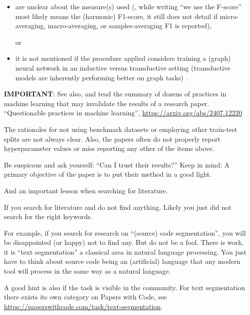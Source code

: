 \documentclass[sigconf, review, nonacm]{acmart}
\begin{document}
\begin{tcolorbox}[title=Instructions]
\begin{itemize}
\item are unclear about the measure(s) used (\eg, while writing ``we use the F-score'' most likely means the (harmonic) F1-score, it still does not detail if micro-averaging, macro-averaging, or samples-averaging F1 is reported),
%

or

\item it is not mentioned if the procedure applied considers training a (graph) neural network in an inductive versus transductive setting (transductive models are inherently performing better on graph tasks)
%
.


\end{itemize}

\textbf{IMPORTANT}: See also, and tead the summary of dozens of practices in machine learning that may invalidate the results of a research paper.
%
``Questionable practices in machine learning'', \url{https://arxiv.org/abs/2407.12220}

\end{tcolorbox}

The rationales for not using benchmark datasets or employing other train-test splits are not always clear.
Also, the papers often do not properly report hyperparameter values or miss reporting any other of the items above.

\begin{tcolorbox}[title=As a general rule when reading related work]

Be suspicous and ask yourself: ``Can I trust their results?''
Keep in mind: A primary objective of the paper is to put their method in a good light.
\end{tcolorbox}

And an important lesson when searching for literature.

\begin{tcolorbox}[title=Lesson learned (once) again!]
If you search for literature and do not find anything. Likely you just did not search for the right keywords.

For example, if you search for research on ``(source) code segmentation'', you will be disappointed (or happy) not to find any.
But do not be a fool. 
There is work, it is ``text segmentation'' a classical area in natural language processing.
You just have to think about source code being an (artificial) language that any modern tool will process in the same way as a natural language.

A good hint is also if the task is visible in the community.
For text segmentation there exists its own category on Papers with Code, see \url{https://paperswithcode.com/task/text-segmentation}.
\end{tcolorbox}
\end{document}
